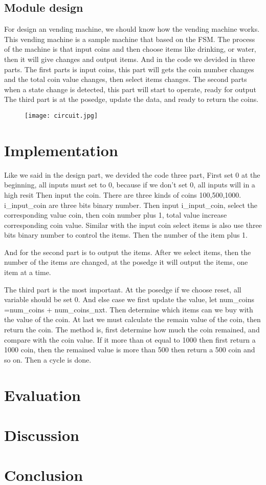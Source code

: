 \documentclass[12pt,a4paper]{article}
\begin{document}
\subsection{Module design}

For design an vending machine, we should know how the vending machine works.
This vending machine is a sample machine that based on the FSM.
The process of the machine is that input coins and then choose items like drinking, or water, then it will give changes and output items.
And in the code we devided in three parts. 
The first parts is input coins, this part will gets the coin number changes and the total coin value changes, then select items changes.
The second parts when a state change is detected, this part will start to operate, ready for output
The third part is at the posedge, update the data, and ready to return the coins. 


\begin{figure}[H]
  \centering
  \texttt{[image: circuit.jpg]}
  \end{figure}


\newpage

\section{Implementation}

Like we said in the design part, we devided the code three part,
First set 0 at the beginning, all inputs must set to 0, because if we don't set 0, all inputs will in a high resit
Then input the coin. There are three kinds of coins 100,500,1000.
i_input_coin are three bits binary number. 
Then input i_input_coin, select the corresponding value coin, then coin number plus 1, total value increase corresponding coin value.
Similar with the input coin select items is also use three bits binary number to control the items.
Then the number of the item plus 1.

And for the second part is to output the items. 
After we select items, then the number of the items are changed, at the posedge it will output the items, one item at a time.

The third part is the most important.
At the posedge if we choose reset, all variable should be set 0.
And else case we first update the value, let num_coins =num_coins + num_coins_nxt.
Then determine which items can we buy with the value of the coin.
At last we must calculate the remain value of the coin, then return the coin.
The method is, first determine how much the coin remained, and compare with the coin value.
If it more than ot equal to 1000 then first return a 1000 coin, then the remained value is more than 500 then return a 500 coin and so on.
Then a cycle is done.  


\newpage

\section{Evaluation}



\newpage
\section{Discussion}



\section{Conclusion}
\end{document}

